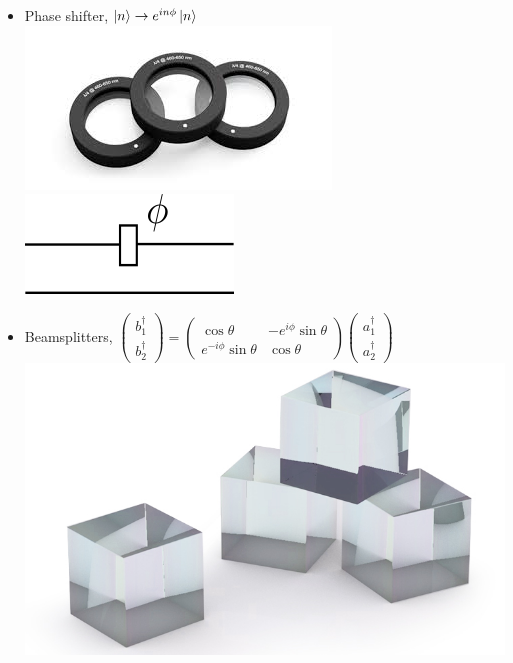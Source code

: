 \documentclass{beamer}
\begin{document}
\begin{frame}
\begin{center}

\begin{itemize}
\item Phase shifter, $\ket{n} \rightarrow e^{i n \phi} \ket{n}$ \includegraphics[height= 3 \baselineskip]{immagini/waveplates.jpeg}
\includegraphics[height= 2 \baselineskip]{immagini/Rz.png}
\vspace{15pt}
\item Beamsplitters, 
$
\begin{pmatrix}
b_{1}^{\dagger}\\
b_{2}^{\dagger}
\end{pmatrix} = 
\begin{pmatrix}
\cos \theta & - e^{i \phi} \sin \theta \\
e^{-i \phi} \sin \theta & \cos \theta
\end{pmatrix}
\begin{pmatrix}
a_{1}^{\dagger}\\
a_{2}^{\dagger}
\end{pmatrix}
$
\includegraphics[height= 4 \baselineskip]{immagini/beamsplitter.png}

\end{itemize}
\end{center}
\end{frame}
\end{document}
